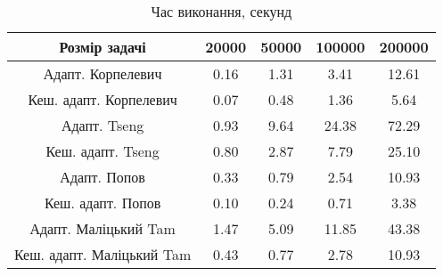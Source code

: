 \begin{table}[H]
	\centering
	\begin{tabular}{|c||c|c|c|c|}\hline
		Розмір задачі & 20000 & 50000 & 100000 & 200000 \\ \hline \hline
		Адапт. Корпелевич & 0.16 & 1.31 & 3.41 & 12.61 \\ \hline
		Кеш. адапт. Корпелевич & 0.07 & 0.48 & 1.36 & 5.64 \\ \hline
		Адапт. Tseng & 0.93 & 9.64 & 24.38 & 72.29 \\ \hline
		Кеш. адапт. Tseng & 0.80 & 2.87 & 7.79 & 25.10 \\ \hline
		Адапт. Попов & 0.33 & 0.79 & 2.54 & 10.93 \\ \hline
		Кеш. адапт. Попов & 0.10 & 0.24 & 0.71 & 3.38 \\ \hline
		Адапт. Маліцький Tam & 1.47 & 5.09 & 11.85 & 43.38 \\ \hline
		Кеш. адапт. Маліцький Tam & 0.43 & 0.77 & 2.78 & 10.93 \\ \hline
	\end{tabular}
	\caption{Час виконання, секунд}
\end{table}
